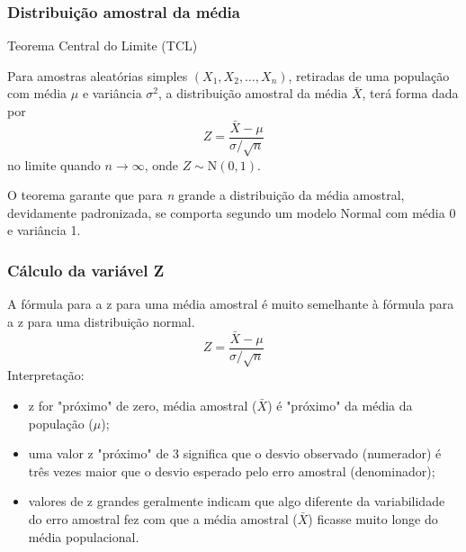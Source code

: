 \documentclass[11pt]{beamer}
\begin{document}
\begin{frame}
\frametitle{Distribuição amostral da média}

\begin{block}{Teorema Central do Limite (TCL)}

Para amostras aleatórias simples \((X_1, X_2, \ldots, X_n)\), retiradas
de uma população com média \(\mu\) e variância \(\sigma^2\), a
distribuição amostral da média \(\bar{X}\), terá forma dada por \[
Z = \frac{\bar{X} - \mu}{\sigma/\sqrt{n}}
\] no limite quando \(n \to \infty\), onde \(Z \sim \text{N}(0,1)\).

\end{block}

O teorema garante que para \textit{n} grande a distribuição da média amostral, devidamente padronizada, se comporta segundo um modelo Normal com média 0 e variância 1.

\end{frame}

\begin{frame}
\frametitle{Cálculo da variável Z}
A fórmula para a z para uma média amostral é muito semelhante à fórmula para a z para uma distribuição normal. 
\[
Z = \frac{\bar{X} - \mu}{\sigma/\sqrt{n}}
\] 
Interpretação:
\begin{itemize}
\item z for "próximo" de zero, média amostral (\(\bar{X}\)) é "próximo" da média da população (\(\mu\)); 
\item uma valor z "próximo" de 3 significa que o desvio observado (numerador) é três vezes maior que o desvio esperado pelo erro amostral (denominador);
\item valores de z grandes geralmente indicam que algo diferente da variabilidade do erro amostral fez com que a média amostral (\(\bar{X}\)) ficasse muito longe do média populacional.
\end{itemize}

\end{frame}
\end{document}
